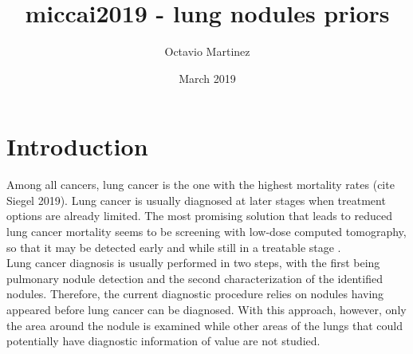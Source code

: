 \documentclass{article}
\title{miccai2019 - lung nodules priors}
\author{Octavio Martinez}
\date{March 2019}
\begin{document}
\maketitle

\section{Introduction}
Among all cancers, lung cancer is the one with the highest mortality rates (cite Siegel 2019). Lung cancer is usually diagnosed at later stages when treatment options are already limited. The most promising solution that leads to reduced lung cancer mortality seems to be screening with low-dose computed tomography, so that it may be detected early and while still in a treatable stage \cite{DeniseR2011}. \\

Lung cancer diagnosis is usually performed in two steps, with the first being pulmonary nodule detection and the second characterization of the identified nodules. Therefore, the current diagnostic procedure relies on nodules having appeared before lung cancer can be diagnosed. With this approach, however, only the area around the nodule is examined while other areas of the lungs that could potentially have diagnostic information of value are not studied.  
\end{document}

